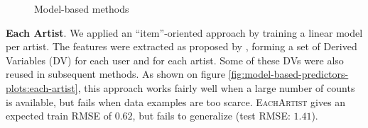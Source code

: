 \documentclass[10pt,a4paper]{article}
\begin{document}
    \begin{figure}
      \center
        \hfill
      \caption{Model-based methods}
      \label{fig:model-based-predictors-plots}
    \end{figure}

    \noindent
    \textbf{Each Artist}. We applied an ``item''-oriented approach by training a linear model per artist. The features were extracted as proposed by \cite{long-tail-recommender}, forming a set of Derived Variables (DV) for each user and for each artist. Some of these DVs were also reused in subsequent methods. As shown on figure \ref{fig:model-based-predictors-plots:each-artist}, this approach works fairly well when a large number of counts is available, but fails when data examples are too scarce. \textsc{EachArtist} gives an expected train RMSE of $0.62$, but fails to generalize (test RMSE: $1.41$).
\end{document}
